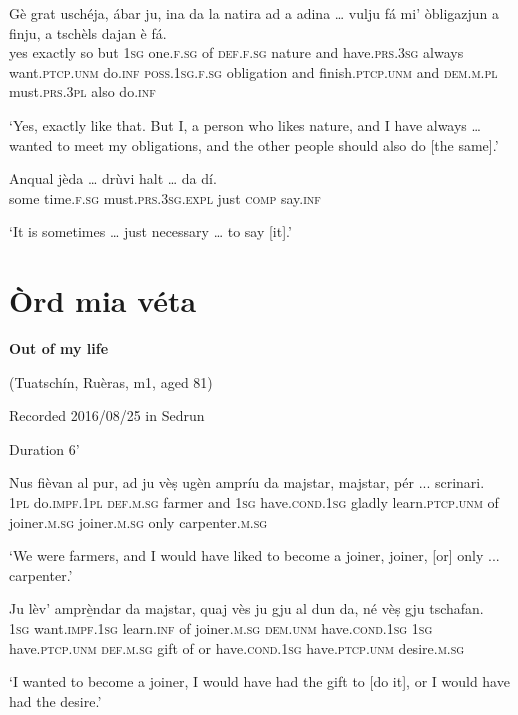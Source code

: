 \begin{linenumbers}
\gll Gè grat uschéja, ábar ju, ina da la natira ad a adina … vulju fá mi' òbligazjun a finju, a tschèls dajan è fá.   \\
yes exactly so but \textsc{1sg} one.\textsc{f.sg} of \textsc{def.f.sg} nature and have.\textsc{prs.3sg} always {} want.\textsc{ptcp.unm} do.\textsc{inf} \textsc{poss.1sg.f.sg} obligation and finish.\textsc{ptcp.unm} and \textsc{dem.m.pl} must.\textsc{prs.3pl} also do.\textsc{inf}\\
\end{linenumbers}
\medskip
\glt `Yes, exactly like that. But I, a person who likes nature, and I have always … wanted to meet my obligations, and the other people should also do [the same].'
\medskip

\begin{linenumbers}
\gll  Anqual jèda … drùvi halt … da dí.\\
some time.\textsc{f.sg} {} must.\textsc{prs.3sg.expl} just {} \textsc{comp} say.\textsc{inf}\\
\end{linenumbers}
\medskip
\glt `It is sometimes … just necessary … to say [it].'
\medskip

\section{Òrd mia véta}\label{sec:8.2}


\textbf{Out of my life}

\noindent
(Tuatschín, Ruèras, m1, aged 81)

\noindent
Recorded 2016/08/25 in Sedrun

Duration 6'
\bigskip


\begin{linenumbers}
\gll    Nus fièvan al pur, ad ju vèṣ ugèn ampríu da majstar, majstar, pér ... scrinari.\\
 \textsc{1pl} do.\textsc{impf.1pl} \textsc{def.m.sg} farmer and \textsc{1sg} have.\textsc{cond.1sg} gladly learn.\textsc{ptcp.unm} of joiner.\textsc{m.sg} joiner.\textsc{m.sg} only {} carpenter.\textsc{m.sg}\\
\end{linenumbers}
\medskip
\glt `We were farmers, and I would have liked to become a joiner, joiner, [or] only ... carpenter.'
\medskip

\begin{linenumbers}
\gll    Ju lèv’ amprè̱ndar da majstar, quaj vès ju gju al dun da, né vèṣ gju tschafan.\\
 \textsc{1sg} want.\textsc{impf.1sg} learn.\textsc{inf} of joiner.\textsc{m.sg} \textsc{dem.unm} have.\textsc{cond.1sg} \textsc{1sg} have.\textsc{ptcp.unm} \textsc{def.m.sg} gift of or have.\textsc{cond.1sg} have.\textsc{ptcp.unm} desire.\textsc{m.sg}\\
\end{linenumbers}
\medskip
\glt `I wanted to become a joiner, I would have had the gift to [do it], or I would have had the desire.'
\medskip

